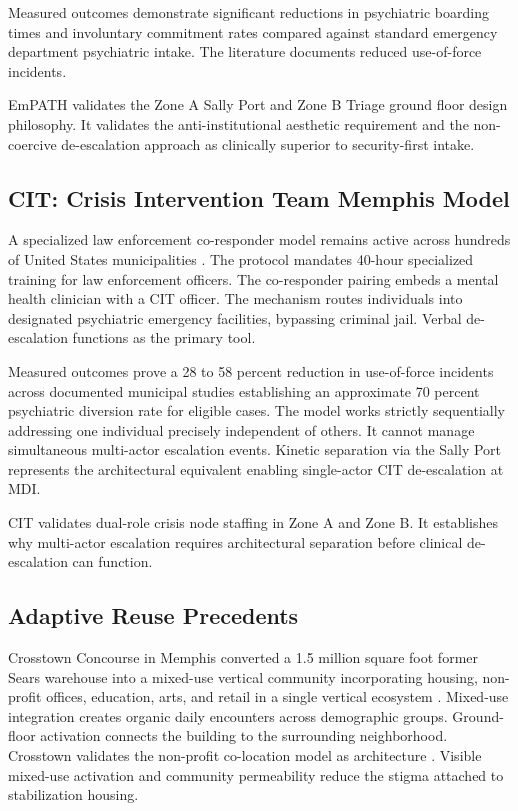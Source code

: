 \documentclass[12pt, letterpaper]{article}
\begin{document}
Measured outcomes demonstrate significant reductions in psychiatric boarding times and involuntary commitment rates compared against standard emergency department psychiatric intake. The literature documents reduced use-of-force incidents.

EmPATH validates the Zone A Sally Port and Zone B Triage ground floor design philosophy. It validates the anti-institutional aesthetic requirement and the non-coercive de-escalation approach as clinically superior to security-first intake.

\subsection{CIT: Crisis Intervention Team Memphis Model}

A specialized law enforcement co-responder model remains active across hundreds of United States municipalities \citep{cit_memphis_model_2023}. The protocol mandates 40-hour specialized training for law enforcement officers. The co-responder pairing embeds a mental health clinician with a CIT officer. The mechanism routes individuals into designated psychiatric emergency facilities, bypassing criminal jail. Verbal de-escalation functions as the primary tool.

Measured outcomes prove a 28 to 58 percent reduction in use-of-force incidents across documented municipal studies establishing an approximate 70 percent psychiatric diversion rate for eligible cases. The model works strictly sequentially addressing one individual precisely independent of others. It cannot manage simultaneous multi-actor escalation events. Kinetic separation via the Sally Port represents the architectural equivalent enabling single-actor CIT de-escalation at MDI.

CIT validates dual-role crisis node staffing in Zone A and Zone B. It establishes why multi-actor escalation requires architectural separation before clinical de-escalation can function.

\subsection{Adaptive Reuse Precedents}

Crosstown Concourse in Memphis converted a 1.5 million square foot former Sears warehouse into a mixed-use vertical community incorporating housing, non-profit offices, education, arts, and retail in a single vertical ecosystem \citep{crosstown_concourse_2017}. Mixed-use integration creates organic daily encounters across demographic groups. Ground-floor activation connects the building to the surrounding neighborhood. Crosstown validates the non-profit co-location model as architecture \citep{la_planning_aro_2026}. Visible mixed-use activation and community permeability reduce the stigma attached to stabilization housing.
\end{document}
